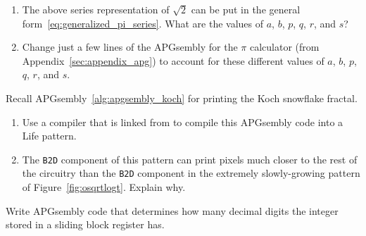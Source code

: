 \begin{multicols}{2}
\begin{problem}
		\begin{enumerate}[label=\bf\color{ocre}(\alph*)]
			\item {} The above series representation of $\sqrt{2}$ can be put in the general form~\eqref{eq:generalized_pi_series}. What are the values of $a$, $b$, $p$, $q$, $r$, and $s$?
			
			\item {} Change just a few lines of the APGsembly for the $\pi$ calculator (from Appendix~\ref{sec:appendix_apg}) to account for these different values of $a$, $b$, $p$, $q$, $r$, and $s$.
			
		\end{enumerate}
	\end{problem}


	\mfilbreak
	
	
	\begin{problem}\label{exer:universal_computation_b2d_why_far}
		Recall APGsembly~\ref{alg:apgsembly_koch} for printing the Koch snowflake fractal.\smallskip
		
		\begin{enumerate}[label=\bf\color{ocre}(\alph*)]
			\item {} Use a compiler that is linked from  to compile this APGsembly code into a Life pattern.
			
			\item {} The \texttt{B2D} component of this pattern can print pixels much closer to the rest of the circuitry than the \texttt{B2D} component in the extremely slowly-growing pattern of Figure~\ref{fig:osqrtlogt}. Explain why.
		\end{enumerate}
	\end{problem}
	
	
	\mfilbreak
	
	
	\begin{problem}\label{exer:universal_computation_determine_digits} 
		Write APGsembly code that determines how many decimal digits the integer stored in a sliding block register has.
	\end{problem}



\end{multicols}
